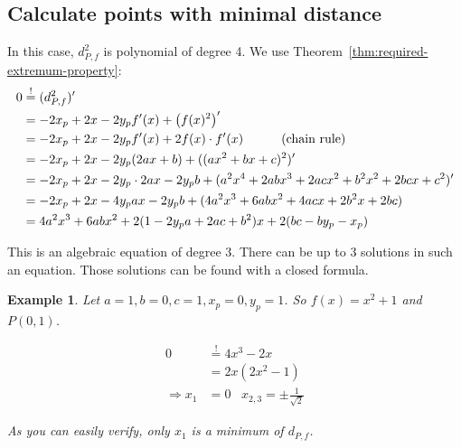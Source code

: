\documentclass[a4paper]{scrartcl}
\theoremstyle{break}
\newtheorem{example}{Example}
\theoremstyle{nonumberplain}
\begin{document}
\subsection{Calculate points with minimal distance}
In this case, $d_{P,f}^2$ is polynomial of degree 4. 
We use Theorem~\ref{thm:required-extremum-property}:\nobreak
\begin{align}
    0     &\overset{!}{=} (d_{P,f}^2)'\\
          &= -2 x_p + 2x -2y_p f'(x) + \left (f(x)^2 \right )'\\
          &= -2 x_p + 2x -2y_p f'(x) + 2 f(x) \cdot f'(x) \rlap{\hspace*{3em}(chain rule)}\label{eq:minimizingFirstDerivative}\\
          &= -2 x_p + 2x -2y_p (2ax+b) + ((ax^2+bx+c)^2)'\\
          &= -2 x_p + 2x -2y_p \cdot 2ax-2 y_p b + (a^2 x^4+2 a b x^3+2 a c x^2+b^2 x^2+2 b c x+c^2)'\\
          &= -2 x_p + 2x -4y_p ax-2 y_p b + (4a^2 x^3 + 6 ab x^2 + 4acx + 2b^2 x + 2bc)\\
          &= 4a^2 x^3 + 6 ab x^2 + 2(1 -2y_p a+ 2ac + b^2)x +2(bc-by_p-x_p)
\end{align}



This is an algebraic equation of degree 3.
There can be up to 3 solutions in such an equation. Those solutions
can be found with a closed formula.


\begin{example}
    Let $a = 1,  b = 0,  c= 1, x_p= 0, y_p = 1$.
    So $f(x) = x^2 + 1$ and $P(0, 1)$.

\begin{align}
    0 &\stackrel{!}{=} 4 x^3 - 2x\\
      &=2x(2x^2 - 1)\\
    \Rightarrow x_1 &= 0 \;\;\; x_{2,3} = \pm \frac{1}{\sqrt{2}}
\end{align}

As you can easily verify, only $x_1$ is a minimum of $d_{P,f}$.
\end{example}
\end{document}
